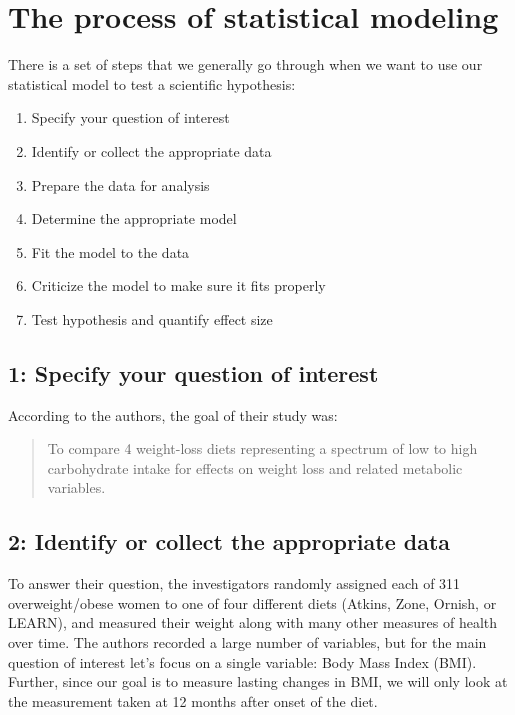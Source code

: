 \documentclass[12pt,]{book}
\providecommand{\tightlist}{%
  \setlength{\itemsep}{0pt}\setlength{\parskip}{0pt}}
\theoremstyle{definition}
\theoremstyle{definition}
\theoremstyle{definition}
\theoremstyle{remark}
\begin{document}
\hypertarget{the-process-of-statistical-modeling}{%
\section{The process of statistical modeling}\label{the-process-of-statistical-modeling}}

There is a set of steps that we generally go through when we want to use our statistical model to test a scientific hypothesis:

\begin{enumerate}
\def\labelenumi{\arabic{enumi}.}
\tightlist
\item
  Specify your question of interest
\item
  Identify or collect the appropriate data
\item
  Prepare the data for analysis
\item
  Determine the appropriate model
\item
  Fit the model to the data
\item
  Criticize the model to make sure it fits properly
\item
  Test hypothesis and quantify effect size
\end{enumerate}

\hypertarget{specify-your-question-of-interest}{%
\subsection{1: Specify your question of interest}\label{specify-your-question-of-interest}}

According to the authors, the goal of their study was:

\begin{quote}
To compare 4 weight-loss diets representing a spectrum of low to high carbohydrate intake for effects on weight loss and related metabolic variables.
\end{quote}

\hypertarget{identify-or-collect-the-appropriate-data}{%
\subsection{2: Identify or collect the appropriate data}\label{identify-or-collect-the-appropriate-data}}

To answer their question, the investigators randomly assigned each of 311 overweight/obese women to one of four different diets (Atkins, Zone, Ornish, or LEARN), and measured their weight along with many other measures of health over time. The authors recorded a large number of variables, but for the main question of interest let's focus on a single variable: Body Mass Index (BMI). Further, since our goal is to measure lasting changes in BMI, we will only look at the measurement taken at 12 months after onset of the diet.
\end{document}
